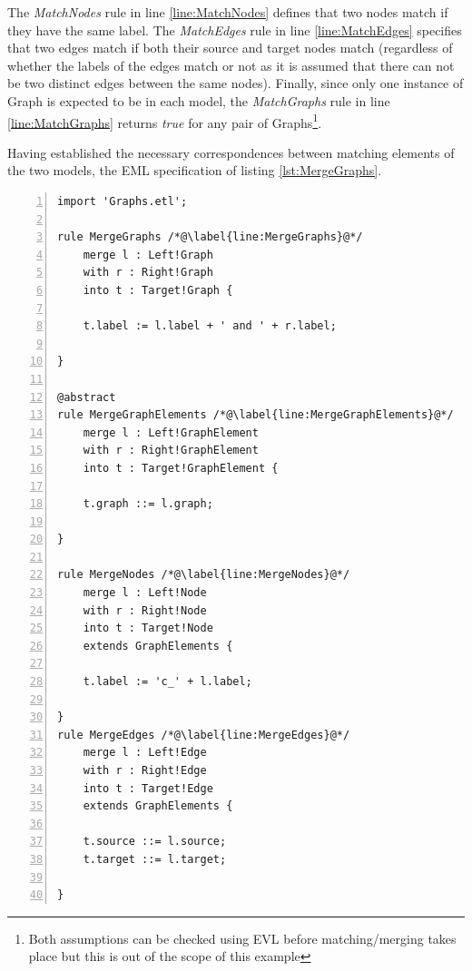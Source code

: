 The \emph{MatchNodes} rule in line \ref{line:MatchNodes} defines that two nodes match if they have the same label. The \emph{MatchEdges} rule in line \ref{line:MatchEdges} specifies that two edges match if both their source and target nodes match (regardless of whether the labels of the edges match or not as it is assumed that there can not be two distinct edges between the same nodes). Finally, since only one instance of Graph is expected to be in each model, the \emph{MatchGraphs} rule in line \ref{line:MatchGraphs} returns \emph{true} for any pair of Graphs\footnote{Both assumptions can be checked using EVL before matching/merging takes place but this is out of the scope of this example}.

Having established the necessary correspondences between matching elements of the two models, the EML specification of listing \ref{lst:MergeGraphs}.

\begin{lstlisting}[basicstyle=\ttfamily\footnotesize, flexiblecolumns=true, numbers=left, nolol=true, label=lst:MergeGraphs, caption=EML module for merging two instances of the Graph metamodel on the correspondences identified in Listing \ref{lst:CompareGraph} , language=EML, tabsize=2]
import 'Graphs.etl';

rule MergeGraphs /*@\label{line:MergeGraphs}@*/
	merge l : Left!Graph
	with r : Right!Graph
	into t : Target!Graph {
	
	t.label := l.label + ' and ' + r.label;
	
}

@abstract
rule MergeGraphElements /*@\label{line:MergeGraphElements}@*/
	merge l : Left!GraphElement
	with r : Right!GraphElement
	into t : Target!GraphElement {
	
	t.graph ::= l.graph;
	
}

rule MergeNodes /*@\label{line:MergeNodes}@*/
	merge l : Left!Node
	with r : Right!Node
	into t : Target!Node 
	extends GraphElements {
	
	t.label := 'c_' + l.label;
	
}
rule MergeEdges /*@\label{line:MergeEdges}@*/
	merge l : Left!Edge
	with r : Right!Edge
	into t : Target!Edge 
	extends GraphElements {
	
	t.source ::= l.source;
	t.target ::= l.target;
	
}
\end{lstlisting}


